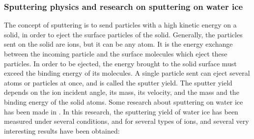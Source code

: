 
\subsubsection{Sputtering physics and research on sputtering on water ice}

The concept of sputtering is to send particles with a high kinetic energy on a solid, in order to eject the surface particles of the solid. Generally, the particles sent on the solid are ions, but it can be any atom. It is the energy exchange between the incoming particle and the surface molecules which eject these particles. In order to be ejected, the energy brought to the solid surface must exceed the binding energy of its molecules. A single particle sent can eject several atoms or particles at once, and is called the sputter yield. The sputter yield depends on the ion incident angle, its mass, its velocity, and the mass and the binding energy of the solid atoms. Some research about sputtering on water ice has been made in \cite{baragiola2003sputtering}.
In this research, the sputtering yield of water ice has been measured under several conditions, and for several types of ions, and several very interesting results have been obtained:

